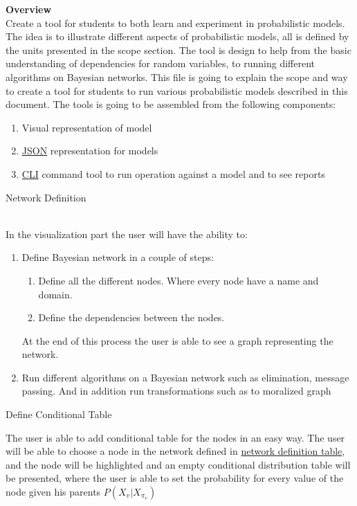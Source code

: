 \documentclass{article}
\begin{document}
    \textbf{Overview}\\
    Create a tool for students to both learn and experiment in probabilistic models. The idea is to illustrate different aspects of probabilistic models, all is defined by the units presented in the scope section.
    The tool is design to help from the basic understanding of dependencies for random variables, to running different algorithms on Bayesian networks.
    This file is going to explain the scope and way to create a tool for students to run various probabilistic models described in this document. The tools is going to be assembled from the following components:
    \begin{enumerate}
        \item Visual representation of model
        \item \hyperlink{JSON}{JSON} representation for models
        \item \hyperlink{CLI}{CLI} command tool to run operation against a model and to see reports
    \end{enumerate}

    \hypertarget{network_defeniton}{Network Definition}\\
    In the visualization part the user will have the ability to:
    \begin{enumerate}
        \item Define Bayesian network in a couple of steps:
        \begin{enumerate}
            \item Define all the different nodes. Where every node have a name and domain.
            \item Define the dependencies between the nodes.
        \end{enumerate}
        At the end of this process the user is able to see a graph representing the network.
        \item Run different algorithms on a Bayesian network such as elimination, message passing. And in addition run transformations such as to moralized graph 
    \end{enumerate}

    \hypertarget{define conditional table}{ Define Conditional Table}
    The user is able to add conditional table for the nodes in an easy way. The user will be able to choose a node in the network defined in \hyperlink{network definition}{network definition table},
    and the node will be highlighted and an empty conditional distribution table will be presented, where the user is able to set the probability for every value of
    the node given his parents $P(X_v|X_{\pi_v})$
\end{document}
